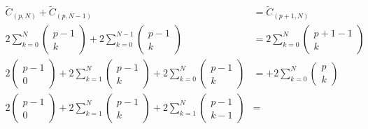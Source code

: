 \begin{align}
	\tilde C_{(p,N)} + \tilde C_{(p,N-1)} 
    &= \tilde C_{(p+1,N)}\\
    2 \sum_{k=0}^{N} \left( \begin{array}{c}
	p-1\\
	k
	\end{array}\right)
    +
    2 \sum_{k=0}^{N-1} \left( \begin{array}{c}
	p-1\\
	k
	\end{array}\right)
    &= 
    2 \sum_{k=0}^{N} \left( \begin{array}{c}
	p+1-1\\
	k
	\end{array}\right)\\
    2 \left( \begin{array}{c}
	p-1\\
	0
	\end{array}\right)
    +
    2 \sum_{k=1}^{N} \left( \begin{array}{c}
	p-1\\
	k
	\end{array}\right)
    +
    2 \sum_{k=0}^{N} \left( \begin{array}{c}
	p-1\\
	k
	\end{array}\right){}
    &= 
    +
    2 \sum_{k=0}^{N} \left( \begin{array}{c}
	p\\
	k
	\end{array}\right)\\
    2 \left( \begin{array}{c}
	p-1\\ 0
	\end{array}\right)
    +
    2 \sum_{k=1}^{N} \left( \begin{array}{c}
	p-1\\ k
	\end{array}\right)
    + 
    2 \sum_{k=1}^{N} \left( \begin{array}{c}
	p-1\\ k-1
	\end{array}\right)
    &=
\end{align}
